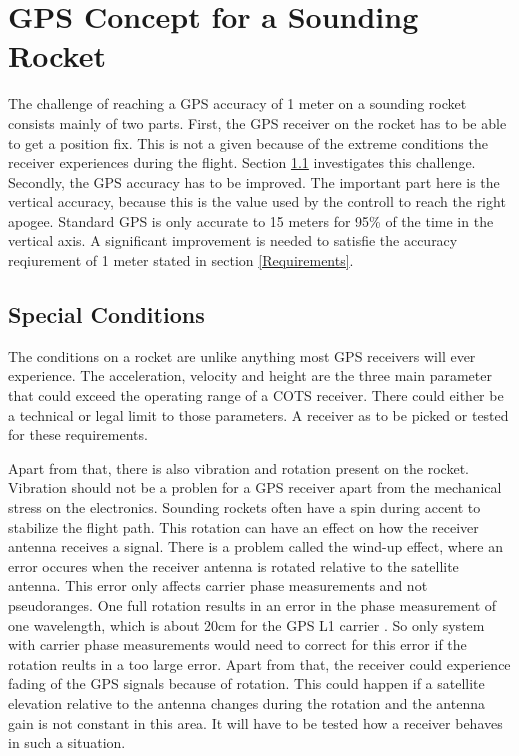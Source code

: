 \chapter{GPS Concept for a Sounding Rocket}

The challenge of reaching a GPS accuracy of 1 meter on a sounding rocket consists mainly of two parts.
First, the GPS receiver on the rocket has to be able to get a position fix.
This is not a given because of the extreme conditions the receiver experiences during the flight.
Section \ref{Special_conditions} investigates this challenge.
Secondly, the GPS accuracy has to be improved.
The important part here is the vertical accuracy, because this is the value used by the controll to reach the right apogee.
Standard GPS is only accurate to 15 meters for 95\% of the time in the vertical axis.
A significant improvement is needed to satisfie the accuracy reqiurement of 1 meter stated in section \ref{Requirements}.


\section{Special Conditions}\label{Special_conditions}

The conditions on a rocket are unlike anything most GPS receivers will ever experience.
The acceleration, velocity and height are the three main parameter that could exceed the operating range of a COTS receiver.
There could either be a technical or legal limit to those parameters.
A receiver as to be picked or tested for these requirements.

Apart from that, there is also vibration and rotation present on the rocket.
Vibration should not be a problen for a GPS receiver apart from the mechanical stress on the electronics.
Sounding rockets often have a spin during accent to stabilize the flight path.
This rotation can have an effect on how the receiver antenna receives a signal.
There is a problem called the wind-up effect, where an error occures when the receiver antenna is rotated relative to the satellite antenna.
This error only affects carrier phase measurements and not pseudoranges.
One full rotation results in an error in the phase measurement of one wavelength, which is about 20cm for the GPS L1 carrier \cite{Wind_up}. 
So only system with carrier phase measurements would need to correct for this error if the rotation reults in a too large error.
Apart from that, the receiver could experience fading of the GPS signals because of rotation.
This could happen if a satellite elevation relative to the antenna changes during the rotation and the antenna gain is not constant in this area.
It will have to be tested how a receiver behaves in such a situation.

